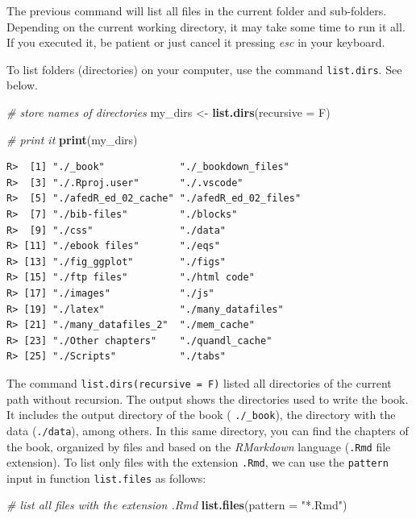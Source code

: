 \documentclass[
  12pt,
]{book}
\newenvironment{Shaded}{\begin{snugshade}}{\end{snugshade}}
\newcommand{\CommentTok}[1]{\textcolor[rgb]{0.37,0.37,0.37}{\textit{#1}}}
\newcommand{\DataTypeTok}[1]{\textcolor[rgb]{0.27,0.27,0.27}{#1}}
\newcommand{\KeywordTok}[1]{\textcolor[rgb]{0.27,0.27,0.27}{\textbf{#1}}}
\newcommand{\NormalTok}[1]{#1}
\newcommand{\StringTok}[1]{\textcolor[rgb]{0.5,0.5,0.5}{#1}}
\begin{document}
The previous command will list all files in the current folder and sub-folders. Depending on the current working directory, it may take some time to run it all. If you executed it, be patient or just cancel it pressing \emph{esc} in your keyboard.

To list folders (directories) on your computer, use the command \texttt{list.dirs}. See below. 

\begin{Shaded}
\begin{Highlighting}[]
\CommentTok{# store names of directories}
\NormalTok{my_dirs <-}\StringTok{ }\KeywordTok{list.dirs}\NormalTok{(}\DataTypeTok{recursive =}\NormalTok{ F)}

\CommentTok{# print it}
\KeywordTok{print}\NormalTok{(my_dirs)}
\end{Highlighting}
\end{Shaded}

\begin{verbatim}
R>  [1] "./_book"             "./_bookdown_files"  
R>  [3] "./.Rproj.user"       "./.vscode"          
R>  [5] "./afedR_ed_02_cache" "./afedR_ed_02_files"
R>  [7] "./bib-files"         "./blocks"           
R>  [9] "./css"               "./data"             
R> [11] "./ebook files"       "./eqs"              
R> [13] "./fig_ggplot"        "./figs"             
R> [15] "./ftp files"         "./html code"        
R> [17] "./images"            "./js"               
R> [19] "./latex"             "./many_datafiles"   
R> [21] "./many_datafiles_2"  "./mem_cache"        
R> [23] "./Other chapters"    "./quandl_cache"     
R> [25] "./Scripts"           "./tabs"
\end{verbatim}

The command \texttt{list.dirs(recursive\ =\ F)} listed all directories of the current path without recursion. The output shows the directories used to write the book. It includes the output directory of the book ( \texttt{./\_book}), the directory with the data (\texttt{./data}), among others. In this same directory, you can find the chapters of the book, organized by files and based on the \emph{RMarkdown} language (\texttt{.Rmd} file extension). To list only files with the extension \texttt{.Rmd}, we can use the \texttt{pattern} input in function \texttt{list.files} as follows:

\begin{Shaded}
\begin{Highlighting}[]
\CommentTok{# list all files with the extension .Rmd}
\KeywordTok{list.files}\NormalTok{(}\DataTypeTok{pattern =} \StringTok{"*.Rmd"}\NormalTok{)}
\end{Highlighting}
\end{Shaded}
\end{document}
